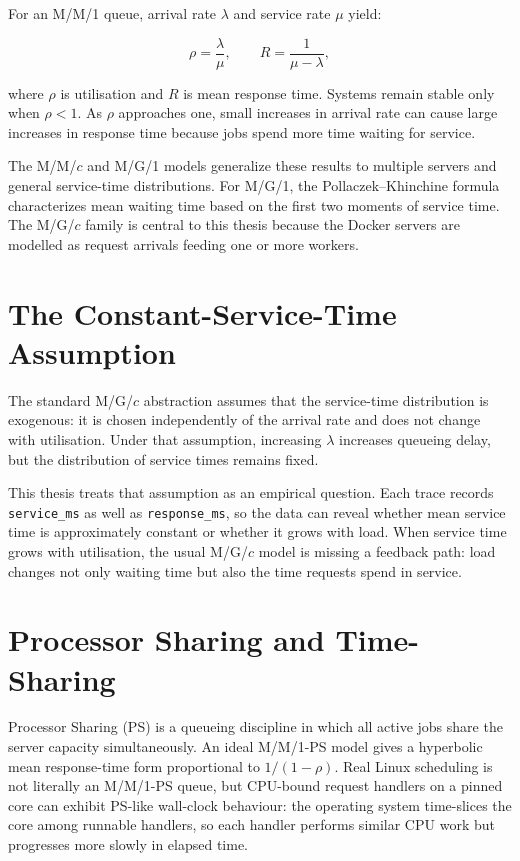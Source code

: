 For an M/M/1 queue, arrival rate $\lambda$ and service rate $\mu$ yield:

\[
\rho = \frac{\lambda}{\mu}, \qquad R = \frac{1}{\mu - \lambda},
\]

where $\rho$ is utilisation and $R$ is mean response time.
Systems remain stable only when $\rho < 1$. As $\rho$ approaches one, small increases in arrival rate can cause large increases in response time because jobs spend more time waiting for service.

The M/M/$c$ and M/G/1 models generalize these results to multiple servers
and general service-time distributions. For M/G/1, the Pollaczek--Khinchine
formula characterizes mean waiting time based on the first two moments of
service time. The M/G/$c$ family is central to this thesis because the Docker servers are modelled as request arrivals feeding one or more workers.

\section{The Constant-Service-Time Assumption}

The standard M/G/$c$ abstraction assumes that the service-time distribution is exogenous: it is chosen independently of the arrival rate and does not change with utilisation. Under that assumption, increasing $\lambda$ increases queueing delay, but the distribution of service times remains fixed.

This thesis treats that assumption as an empirical question. Each trace records \texttt{service\_ms} as well as \texttt{response\_ms}, so the data can reveal whether mean service time is approximately constant or whether it grows with load. When service time grows with utilisation, the usual M/G/$c$ model is missing a feedback path: load changes not only waiting time but also the time requests spend in service.

\section{Processor Sharing and Time-Sharing}

Processor Sharing (PS) is a queueing discipline in which all active jobs share the server capacity simultaneously. An ideal M/M/1-PS model gives a hyperbolic mean response-time form proportional to $1/(1-\rho)$. Real Linux scheduling is not literally an M/M/1-PS queue, but CPU-bound request handlers on a pinned core can exhibit PS-like wall-clock behaviour: the operating system time-slices the core among runnable handlers, so each handler performs similar CPU work but progresses more slowly in elapsed time.

